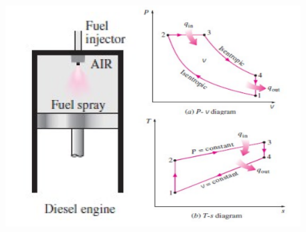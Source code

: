 \documentclass[10pt,compress]{beamer}
\begin{document}
\begin{frame}
\begin{columns}
\begin{column}[c]{0.5\linewidth}
\begin{enumerate}
{\begin{displaymath}
          \end{displaymath}}
     \end{enumerate}
    \begin{figure}%
     \begin{center}
      \includegraphics[width=4.cm,clip]{./Pics/InternalCombustion_IdealDieselCycle}
     \end{center}
    \end{figure}   
   \end{column}  
  \end{columns}
\end{frame}
\end{document}
